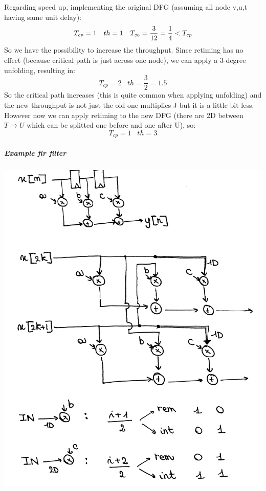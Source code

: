 Regarding speed up, implementing the original DFG (assuming all node v,u,t having same unit delay):
\begin{equation}
  T_{cp}=1  \hspace{10pt} th=1 \hspace{10 pt}  T_{\infty}=\frac{3}{12}=\frac{1}{4} < T_{cp}
\end{equation}
So we have the possibility to increase the throughput. Since retiming has no effect (because critical path is just across one node), we can apply a 3-degree unfolding, resulting in:
\begin{equation}
T_{cp}=2  \hspace{10pt} th=\frac{3}{2}=1.5
\end{equation}
So the critical path increases (this is quite common when applying unfolding) and the new throughput is not just the old one multiplies J but it is a little bit less. However now we can apply retiming to the new DFG (there are 2D between $T\rightarrow U$ which can be splitted one before and one after U), so:
\begin{equation}
T_{cp}=1  \hspace{10pt} th=3
\end{equation}

\subparagraph{Example fir filter}

\begin{center}
  \includegraphics[width=0.9\linewidth]{img/img1/27}
\end{center}

